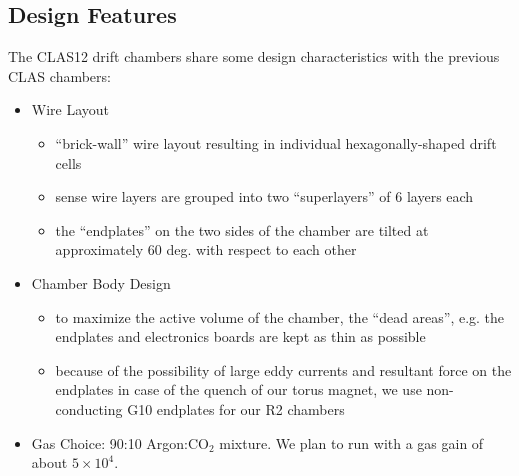 \subsection{Design Features}
The CLAS12 drift chambers share some design characteristics with the
previous CLAS chambers:
\begin{itemize}
\item Wire Layout
\begin{itemize}
\item ``brick-wall'' wire layout resulting in individual hexagonally-shaped
drift cells
\item sense wire layers are grouped into two ``superlayers'' of 6 layers each
\item the ``endplates'' on the two sides of the chamber are tilted 
at approximately 60 deg. with respect to each other
\end{itemize}
\item Chamber Body Design
\begin{itemize}
\item to maximize the active volume of the chamber, the ``dead areas'', e.g.
the endplates and electronics boards are kept as thin as possible
\item because of the possibility of large eddy currents and resultant
force on the endplates in case of the quench of our torus magnet, we
use non-conducting G10 endplates for our R2 chambers
\end{itemize}
\item Gas Choice: 90:10 Argon:CO$_2$ mixture.  We plan to run with a gas gain of 
about $5 \times 10^4$.
\end{itemize}

